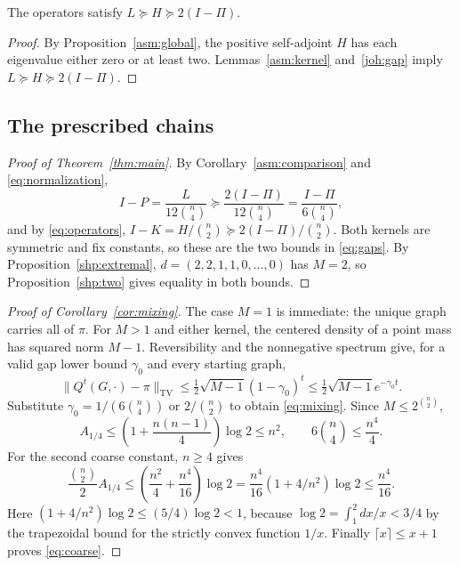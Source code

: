 \begin{corollary}\label{asm:comparison}
The operators satisfy $L\succeq H\succeq2(I-\Pi)$.
\end{corollary}
\begin{proof}
By Proposition~\ref{asm:global}, the positive self-adjoint $H$ has each
eigenvalue either zero or at least two. Lemmas~\ref{asm:kernel}
and~\ref{joh:gap} imply $L\succeq H\succeq2(I-\Pi)$.
\end{proof}

\subsection{The prescribed chains}
\begin{proof}[Proof of Theorem~\ref{thm:main}]
By Corollary~\ref{asm:comparison} and \eqref{eq:normalization},
\[
 I-P=\frac{L}{12\binom n4}\succeq\frac{2(I-\Pi)}{12\binom n4}
 =\frac{I-\Pi}{6\binom n4},
\]
and by \eqref{eq:operators}, $I-K=H/\binom n2\succeq2(I-\Pi)/\binom n2$. Both
kernels are symmetric and fix constants, so these are the two bounds in
\eqref{eq:gaps}. By Proposition~\ref{shp:extremal},
$d=(2,2,1,1,0,\ldots,0)$ has $M=2$, so Proposition~\ref{shp:two} gives
equality in both bounds.
\end{proof}

\begin{proof}[Proof of Corollary~\ref{cor:mixing}]
The case $M=1$ is immediate: the unique graph carries all of $\pi$. For
$M>1$ and either kernel, the centered density of a point mass has squared
norm $M-1$. Reversibility and the nonnegative spectrum give, for a valid gap
lower bound $\gamma_0$ and every starting graph,
\begin{equation}\label{asm:tv}
 \|Q^t(G,\cdot)-\pi\|_{\mathrm{TV}}
 \le\tfrac12\sqrt{M-1}(1-\gamma_0)^t
 \le\tfrac12\sqrt{M-1}e^{-\gamma_0t}.
\end{equation}
Substitute $\gamma_0=1/(6\binom n4)$ or $2/\binom n2$ to obtain
\eqref{eq:mixing}. Since $M\le2^{\binom n2}$,
\[
 A_{1/4}\le\left(1+\frac{n(n-1)}4\right)\log2\le n^2,
 \qquad 6\binom n4\le\frac{n^4}{4}.
\]
For the second coarse constant, $n\ge4$ gives
\[
 \frac{\binom n2}{2}A_{1/4}
 \le\left(\frac{n^2}{4}+\frac{n^4}{16}\right)\log2
 =\frac{n^4}{16}(1+4/n^2)\log2\le\frac{n^4}{16}.
\]
Here $(1+4/n^2)\log2\le(5/4)\log2<1$, because
$\log2=\int_1^2 dx/x<3/4$ by the trapezoidal bound for the strictly convex
function $1/x$. Finally $\lceil x\rceil\le x+1$ proves \eqref{eq:coarse}.
\end{proof}
